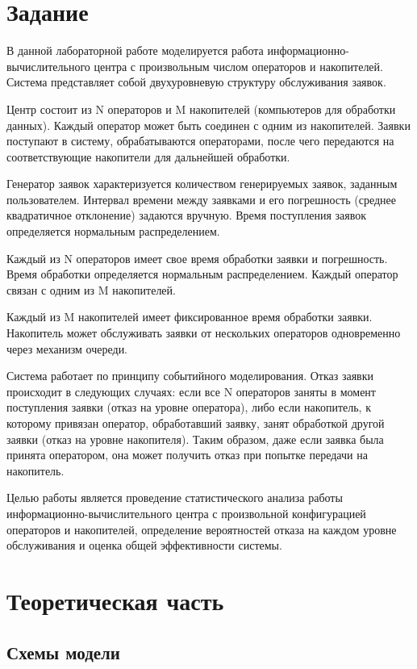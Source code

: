 \section{Задание}

В данной лабораторной работе моделируется работа информационно-вычислительного центра с произвольным числом операторов и накопителей. Система представляет собой двухуровневую структуру обслуживания заявок.

Центр состоит из N операторов и M накопителей (компьютеров для обработки данных). Каждый оператор может быть соединен с одним из накопителей. Заявки поступают в систему, обрабатываются операторами, после чего передаются на соответствующие накопители для дальнейшей обработки.

Генератор заявок характеризуется количеством генерируемых заявок, заданным пользователем. Интервал времени между заявками и его погрешность (среднее квадратичное отклонение) задаются вручную. Время поступления заявок определяется нормальным распределением.

Каждый из N операторов имеет свое время обработки заявки и погрешность. Время обработки определяется нормальным распределением. Каждый оператор связан с одним из M накопителей.

Каждый из M накопителей имеет фиксированное время обработки заявки. Накопитель может обслуживать заявки от нескольких операторов одновременно через механизм очереди.

Система работает по принципу событийного моделирования. Отказ заявки происходит в следующих случаях: если все N операторов заняты в момент поступления заявки (отказ на уровне оператора), либо если накопитель, к которому привязан оператор, обработавший заявку, занят обработкой другой заявки (отказ на уровне накопителя). Таким образом, даже если заявка была принята оператором, она может получить отказ при попытке передачи на накопитель.

Целью работы является проведение статистического анализа работы информационно-вычислительного центра с произвольной конфигурацией операторов и накопителей, определение вероятностей отказа на каждом уровне обслуживания и оценка общей эффективности системы.

\section{Теоретическая часть}

\subsection{Схемы модели}


